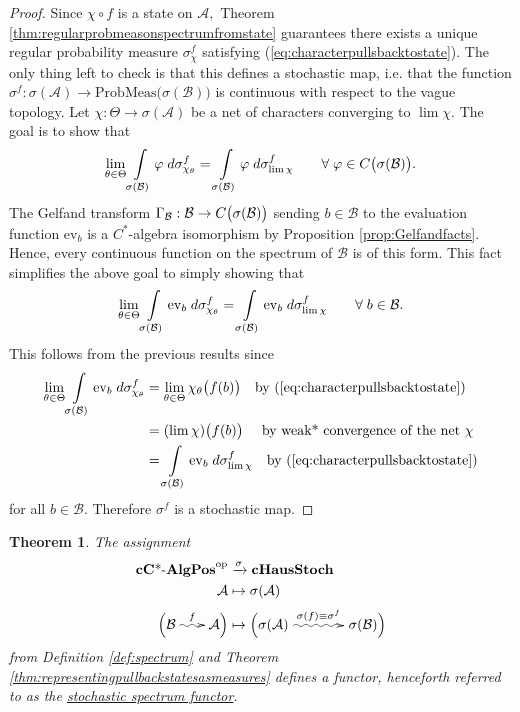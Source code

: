 \documentclass[12pt]{article}
\edef\t{\pgfmathresult}%
\theoremstyle{theorem}
\newtheorem{theorem}[equation]{Theorem}
\theoremstyle{definition}
\numberwithin{equation}{section}
\let\s=\sigma \let\t=\tau \let\u=\upsilon \let\f=\phi \let\c=\chi
\def\vf{\varphi}
\newcommand{\be}{\begin{equation}}
\newcommand{\ee}{\end{equation}}
\newcommand{\bt}{\begin{theorem}}
\newcommand{\et}{\end{theorem}}
\newcommand{\bprf}{\begin{proof}}
\newcommand{\eprf}{\end{proof}}
\newcommand{\<}{\langle}
\renewcommand{\>}{\rangle}
\newcommand{\cCAlgPos}{\mathbf{cC\text{*-}AlgPos}}
\def\mA{{{\mathcal{A}}}}
\def\mB{{{\mathcal{B}}}}
\newcommand{\op}{\mathrm{op}}
\newcommand{\cHStoch}{\mathbf{cHausStoch}}
\begin{document}
\bprf
Since $\chi\circ f$ is a state on $\mA,$ Theorem 
\ref{thm:regularprobmeasonspectrumfromstate} 
guarantees there exists a unique regular probability measure $\s^{f}_{\chi}$
satisfying (\ref{eq:characterpullsbacktostate}).
The only thing left to check is that this defines a stochastic map,
i.e. that the function $\s^{f}:\s(\mA)\to\mathrm{ProbMeas}\big(\s(\mB)\big)$
is continuous with respect to the vague topology. 
Let $\chi:\Theta\to\s(\mA)$ be a net of characters converging to $\lim\chi.$ 
The goal is to show that 
\be
\lim_{\q\in\Theta}\int\displaylimits_{\s(\mB)}\vf\;d\s^{f}_{\chi_{\q}}=\int\displaylimits_{\s(\mB)}\vf\;d\s^{f}_{\lim\chi}
\qquad\forall\;\vf\in C\big(\s(\mB)\big). 
\ee
The Gelfand transform $\G_{\mB}:\mB\to C\big(\s(\mB)\big)$ sending
$b\in\mB$ to the evaluation function $\mathrm{ev}_{b}$ is a
$C^*$-algebra isomorphism by Proposition \ref{prop:Gelfandfacts}.
Hence, every continuous function on the spectrum of $\mB$ is 
of this form. This fact simplifies the above goal to simply showing that 
\be
\lim_{\q\in\Theta}\int\displaylimits_{\s(\mB)}\mathrm{ev}_{b}\;d\s^{f}_{\chi_{\q}}
=\int\displaylimits_{\s(\mB)}\mathrm{ev}_{b}\;d\s^{f}_{\lim\chi}
\qquad\forall\;b\in\mB. 
\ee
This follows from the previous results since
\be
\begin{split}
\lim_{\q\in\Theta}\int\displaylimits_{\s(\mB)}\mathrm{ev}_{b}\;d\s^{f}_{\chi_{\q}}&=
\lim_{\q\in\Theta}\chi_{\q}\big(f(b)\big)\quad\text{by (\ref{eq:characterpullsbacktostate})}\\
&=(\lim\chi)\big(f(b)\big)\quad\text{ by weak* convergence of the net $\chi$}\\
&=\int\displaylimits_{\s(\mB)}\mathrm{ev}_{b}\;d\s^{f}_{\lim\chi}\quad\text{by (\ref{eq:characterpullsbacktostate})}
\end{split}
\ee
for all $b\in\mB.$ 
Therefore $\s^{f}$ is a stochastic map. 
\eprf

\bt
\label{thm:stochasticspectrum}
The assignment 
\be
\begin{split}
\cCAlgPos^{\op}&\xrightarrow{\s}\cHStoch\\
\mA&\mapsto\s(\mA)\\
\Big(\mB\;\xy0;/r.25pc/:\ar@{~>}(-3,0);(3,0)^{f}\endxy\;\mA\Big)&\mapsto\Big(\s(\mA)\;\xy0;/r.25pc/:\ar@{~>}(-6,0);(6,0)^{\s(f)\equiv\s^{f}}\endxy\;\s(\mB)\Big)\\
\end{split}
\ee
from Definition \ref{def:spectrum}
and Theorem \ref{thm:representingpullbackstatesasmeasures}
defines a functor, henceforth referred to as the 
\emph{\uline{stochastic spectrum functor}}. 
\et
\end{document}
